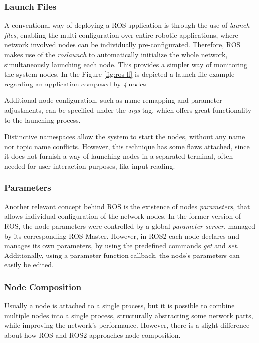 \subsubsection{Launch Files}

A conventional way of deploying a ROS application is through the use of \textit{launch files}, enabling the multi-configuration over entire robotic applications, where network involved nodes can be individually pre-configurated. Therefore, ROS makes use of the \textit{roslaunch} to automatically initialize the whole network, simultaneously launching each node. \cite{intro-ros} This provides a simpler way of monitoring the system nodes. In the Figure \ref{fig:ros-lf} is depicted a launch file example regarding an application composed by \textit{4} nodes.

Additional node configuration, such as name remapping and parameter adjustments, can be specified under the \textit{args} tag, which offers great functionality to the launching process. 

Distinctive namespaces allow the system to start the nodes, without any name nor topic name conflicts. However, this technique has some flaws attached, since it does not furnish a way of launching nodes in a separated terminal, often needed for user interaction purposes, like input reading.

\subsubsection{Parameters}   

Another relevant concept behind ROS is the existence of nodes \textit{parameters}, that allows individual configuration of the network nodes. In the former version of ROS, the node parameters were controlled by a global \textit{parameter server}, managed by its corresponding ROS Master. \cite{intro-ros} However, in ROS2 each node declares and manages its own parameters, by using the predefined commands \textit{get} and \textit{set}. Additionally, using a parameter function callback, the node's parameters can easily be edited. \cite{ros2documentation}
        
\subsubsection{Node Composition}  

Usually a node is attached to a single process, but it is possible to combine multiple nodes into a single process, structurally abstracting some network parts, while improving the network's performance. \cite{ros2documentation} However, there is a slight difference about how ROS and ROS2 approaches node composition. 

